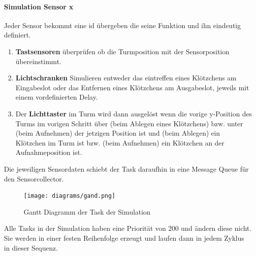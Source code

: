\paragraph{Simulation Sensor x}
Jeder Sensor bekommt eine id übergeben die seine Funktion und ihn eindeutig definiert. 
\begin{enumerate} 
\item \textbf{Tastsensoren} überprüfen ob die Turmposition mit der Sensorposition übereinstimmt.
\item \textbf{Lichtschranken} Simulieren entweder das eintreffen eines Klötzchens am Eingabeslot oder das Entfernen eines Klötzchens am Ausgabeslot, jeweils mit einem vordefinierten Delay.
\item Der \textbf{Lichttaster} im Turm wird dann ausgelöst wenn die vorige y-Position des Turms im vorigen Schritt über (beim Ablegen eines Klötzchens) bzw. unter (beim Aufnehmen) der jetzigen Position ist und (beim Ablegen) ein Klötzchen im Turm ist bzw. (beim Aufnehmen) ein Klötzchen an der Aufnahmeposition ist.
\end{enumerate}
Die jeweiligen Sensordaten schiebt der Task daraufhin in eine Message Queue für den Sensorcollector.

\begin{figure}[H]
	\centering
  \texttt{[image: diagrams/gand.png]}
	\caption{Gantt Diagramm der Task der Simulation}
	\label{gantt}
\end{figure}

Alle Tasks in der Simulation haben eine Priorität von 200 und ändern diese nicht. Sie werden in einer festen Reihenfolge erzeugt und laufen dann in jedem Zyklus in dieser Sequenz.

